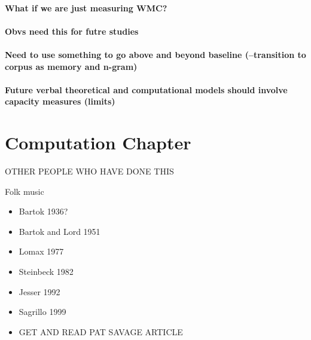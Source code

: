 \documentclass[]{book}
\theoremstyle{definition}
\theoremstyle{definition}
\theoremstyle{definition}
\theoremstyle{remark}
\begin{document}
\hypertarget{what-if-we-are-just-measuring-wmc}{%
\subsubsection{What if we are just measuring
WMC?}\label{what-if-we-are-just-measuring-wmc}}

\hypertarget{obvs-need-this-for-futre-studies}{%
\subsubsection{Obvs need this for futre
studies}\label{obvs-need-this-for-futre-studies}}

\hypertarget{need-to-use-something-to-go-above-and-beyond-baseline-transition-to-corpus-as-memory-and-n-gram}{%
\subsubsection{Need to use something to go above and beyond baseline
(--transition to corpus as memory and
n-gram)}\label{need-to-use-something-to-go-above-and-beyond-baseline-transition-to-corpus-as-memory-and-n-gram}}

\hypertarget{future-verbal-theoretical-and-computational-models-should-involve-capacity-measures-limits}{%
\subsubsection{Future verbal theoretical and computational models should
involve capacity measures
(limits)}\label{future-verbal-theoretical-and-computational-models-should-involve-capacity-measures-limits}}

\hypertarget{computation-chapter}{%
\chapter{Computation Chapter}\label{computation-chapter}}

OTHER PEOPLE WHO HAVE DONE THIS

Folk music

\begin{itemize}
\item
  Bartok 1936?
\item
  Bartok and Lord 1951
\item
  Lomax 1977
\item
  Steinbeck 1982
\item
  Jesser 1992
\item
  Sagrillo 1999
\item
  GET AND READ PAT SAVAGE ARTICLE
\end{itemize}
\end{document}
